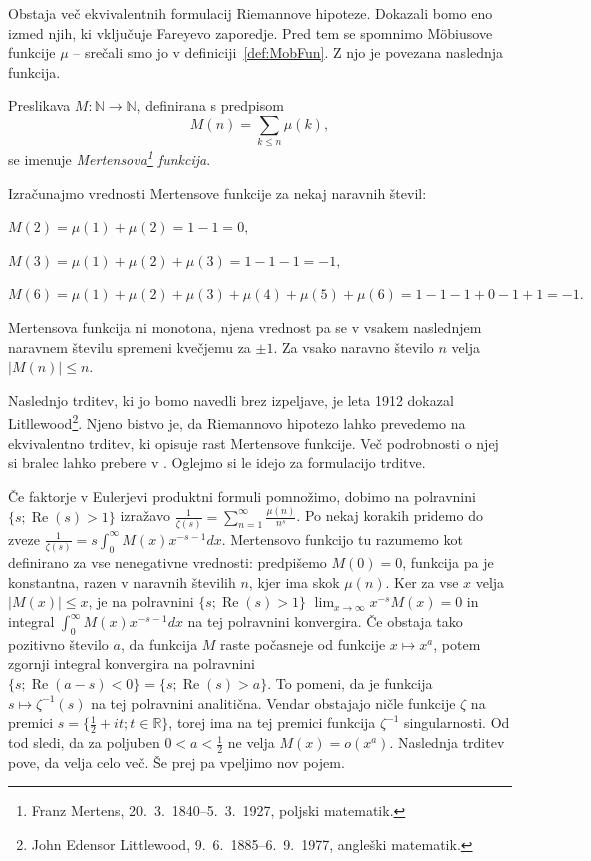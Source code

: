\documentclass[mat1]{fmfdelo}
\DeclareMathOperator{\re}{Re}
\begin{document}
Obstaja več ekvivalentnih formulacij Riemannove hipoteze. Dokazali bomo eno izmed njih, ki vključuje Fareyevo zaporedje. Pred tem se spomnimo M\"obiusove funkcije $\mu$ -- srečali smo jo v definiciji~\ref{def:MobFun}. Z njo je povezana naslednja funkcija.

\begin{definicija}
Preslikava $M \colon \mathbb{N} \to \mathbb{N}$, definirana s predpisom
\begin{equation}
M(n)=\sum_{k\leq n}\mu(k),
\end{equation}
se imenuje \emph{Mertensova\footnote{Franz Mertens, 20.\ 3.\ 1840--5.\ 3.\ 1927, poljski matematik.} funkcija}.
\end{definicija}

\begin{primer}
Izračunajmo vrednosti Mertensove funkcije za nekaj naravnih števil:

\( M(2) = \mu(1) + \mu(2) = 1 - 1 = 0, \)

\( M(3) = \mu(1) + \mu(2) + \mu(3) = 1 - 1 - 1 = -1, \)

\( M(6) = \mu(1) + \mu(2) + \mu(3) + \mu(4) + \mu(5) + \mu(6) = 1 - 1 - 1 + 0 - 1 + 1 = -1. \)
\end{primer}

Mertensova funkcija ni monotona, njena vrednost pa se v vsakem naslednjem naravnem številu spremeni kvečjemu za $\pm 1$. Za vsako naravno število $n$ velja $|M(n)| \leq n$.

Naslednjo trditev, ki jo bomo navedli brez izpeljave, je leta 1912 dokazal Litllewood\footnote{John Edensor Littlewood, 9.\ 6.\ 1885--6.\ 9.\ 1977, angleški matematik.}. Njeno bistvo je, da Riemannovo hipotezo lahko prevedemo na ekvivalentno trditev, ki opisuje rast Mertensove funkcije. 
Več podrobnosti o njej si bralec lahko prebere v \cite[poglavje 12.1]{zetafunction}.
%
Oglejmo si le idejo za formulacijo trditve.

Če faktorje v Eulerjevi produktni formuli pomnožimo, dobimo na polravnini $\{s; \re(s)>1\}$ izražavo $ \frac{1}{\zeta(s)} = \sum_{n=1}^{\infty} \frac{\mu(n)}{n^s} $. 
Po nekaj korakih pridemo do zveze $ \frac{1}{\zeta(s)} = s \int_{0}^{\infty} M(x) x^{-s-1}dx $. 
Mertensovo funkcijo tu razumemo kot definirano za vse nenegativne vrednosti: predpišemo $M(0)=0$, funkcija pa je konstantna, razen v naravnih številih $n$, kjer ima skok $\mu(n)$.
Ker za vse $x$ velja $ |M(x)| \leq x $, je na polravnini $\{s; \re(s)>1\}$ $ \lim_{x \to \infty} x^{-s}M(x) = 0$ in integral $ \int_{0}^{\infty} M(x) x^{-s-1}dx $ na tej polravnini konvergira.
Če obstaja tako pozitivno število $a$, da funkcija $M$ raste počasneje od funkcije $x \mapsto x^{a}$, potem zgornji integral konvergira na polravnini $\{s; \re(a-s)<0\} = \{s; \re(s)>a\}$.
To pomeni, da je funkcija $s \mapsto \zeta^{-1}(s) $ na tej polravnini analitična. 
Vendar obstajajo ničle funkcije $\zeta$ na premici $s = \{\frac{1}{2}+it; t \in \mathbb{R} \}$, torej ima na tej premici funkcija $\zeta^{-1}$ singularnosti.
Od tod sledi, da za poljuben $0<a<\frac{1}{2}$ ne velja $M(x) = o(x^{a})$.
Naslednja trditev pove, da velja celo več. Še prej pa vpeljimo nov pojem.
\end{document}

